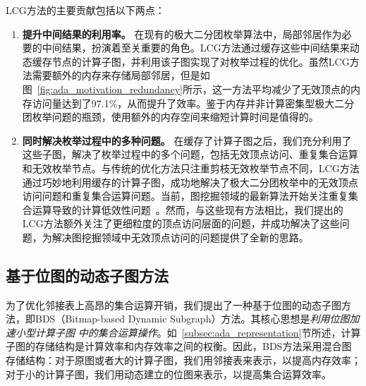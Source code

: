 \begin{example}
\end{example}

LCG方法的主要贡献包括以下两点：

\begin{enumerate}
	\item \textbf{提升中间结果的利用率。}
	在现有的极大二分团枚举算法中，局部邻居作为必要的中间结果，扮演着至关重要的角色。LCG方法通过缓存这些中间结果来动态缓存节点的计算子图，并利用该子图实现了对枚举过程的优化。虽然LCG方法需要额外的内存来存储局部邻居，但是如图~\ref{fig:ada_motivation_redundancy}所示，这一方法平均减少了无效顶点的内存访问量达到了97.1\%，从而提升了效率。鉴于内存并非计算密集型极大二分团枚举问题的瓶颈，使用额外的内存空间来缩短计算时间是值得的。
	


	\item \textbf{同时解决枚举过程中的多种问题。}
	在缓存了计算子图之后，我们充分利用了这些子图，解决了枚举过程中的多个问题，包括无效顶点访问、重复集合运算和无效枚举节点。与传统的优化方法只注重剪枝无效枚举节点不同，LCG方法通过巧妙地利用缓存的计算子图，成功地解决了极大二分团枚举中的无效顶点访问问题和重复集合运算问题。当前，图挖掘领域的最新算法开始关注重复集合运算导致的计算低效性问题~\cite{Graphpi20,GPMredundancy23}。然而，与这些现有方法相比，我们提出的LCG方法额外关注了更细粒度的顶点访问层面的问题，并成功解决了这些问题，为解决图挖掘领域中无效顶点访问的问题提供了全新的思路。

\end{enumerate}



\subsection{基于位图的动态子图方法}
\label{subsec:ada_design_1}

为了优化邻接表上高昂的集合运算开销，我们提出了一种基于位图的动态子图方法，即BDS（Bitmap-based Dynamic Subgraph）方法。其核心思想是\emph{利用位图加速小型计算子图} \emph{中的集合运算操作}。如~\ref{subsec:ada_representation}节所述，计算子图的存储结构是计算效率和内存效率之间的权衡。因此，BDS方法采用混合图存储结构：对于原图或者大的计算子图，我们用邻接表来表示，以提高内存效率；对于小的计算子图，我们用动态建立的位图来表示，以提高集合运算效率。

